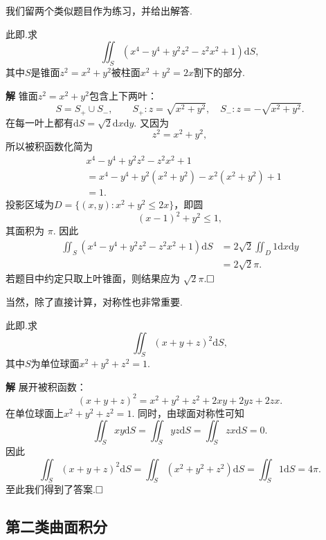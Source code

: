 \documentclass{ctexart}
\newenvironment{custom}[1]{\par\noindent \textbf{#1}\quad}{\par\vspace{1em}}
\begin{document}
我们留两个类似题目作为练习，并给出解答.

\begin{exercise}
此即\cite[25.1.3练习题4]{XHM}.求
\[
\iint_{S}{(x^{4}-y^{4}+y^{2}z^{2}-z^{2}x^{2}+1)\mathrm{d}S},
\]
其中$S$是锥面$z^{2}=x^{2}+y^{2}$被柱面$x^{2}+y^{2}=2x$割下的部分.
\end{exercise}

\begin{custom}{解}
锥面$z^{2}=x^{2}+y^{2}$包含上下两叶：
\[
S=S_{+}\cup S_{-},\qquad S_{+}:z=\sqrt{x^{2}+y^{2}},\quad S_{-}:z=-\sqrt{x^{2}+y^{2}}.
\]
在每一叶上都有$\mathrm{d}S=\sqrt{2}\mathrm{d}x\mathrm{d}y.$ 又因为
\[
z^{2}=x^{2}+y^{2},
\]
所以被积函数化简为
\[
\begin{aligned}
&x^{4}-y^{4}+y^{2}z^{2}-z^{2}x^{2}+1\\
&=x^{4}-y^{4}+y^{2}(x^{2}+y^{2})-x^{2}(x^{2}+y^{2})+1\\
&=1.
\end{aligned}
\]
投影区域为$D=\{(x,y):x^{2}+y^{2}\leqslant 2x\}$，即圆
$$
(x-1)^{2}+y^{2}\leqslant 1,
$$
其面积为 $\pi$. 因此
\[
\begin{aligned}
\iint_{S}{(x^{4}-y^{4}+y^{2}z^{2}-z^{2}x^{2}+1)\mathrm{d}S}
&=2\sqrt{2}\iint_{D}1\mathrm{d}x\mathrm{d}y\\
&=2\sqrt{2}\pi.
\end{aligned}
\]
若题目中约定只取上叶锥面，则结果应为 $\sqrt{2}\pi$.$\hfill{\square}$
\end{custom}

当然，除了直接计算，对称性也非常重要.

\begin{exercise}
此即\cite[25.1.3练习题3]{XHM}.求
\[
\iint_{S}{(x+y+z)^{2}\mathrm{d}S},
\]
其中$S$为单位球面$x^{2}+y^{2}+z^{2}=1$.
\end{exercise}

\begin{custom}{解}
展开被积函数：
\[
(x+y+z)^{2}=x^{2}+y^{2}+z^{2}+2xy+2yz+2zx.
\]
在单位球面上$x^{2}+y^{2}+z^{2}=1.$ 同时，由球面对称性可知
\[
\iint_{S}xy\mathrm{d}S=\iint_{S}yz\mathrm{d}S=\iint_{S}zx\mathrm{d}S=0.
\]
因此
$$\iint_{S}(x+y+z)^{2}\mathrm{d}S=\iint_{S}(x^{2}+y^{2}+z^{2})\mathrm{d}S=\iint_{S}1\mathrm{d}S=4\pi.$$
至此我们得到了答案.$\hfill{\square}$
\end{custom}

\subsection{第二类曲面积分}
\end{document}
